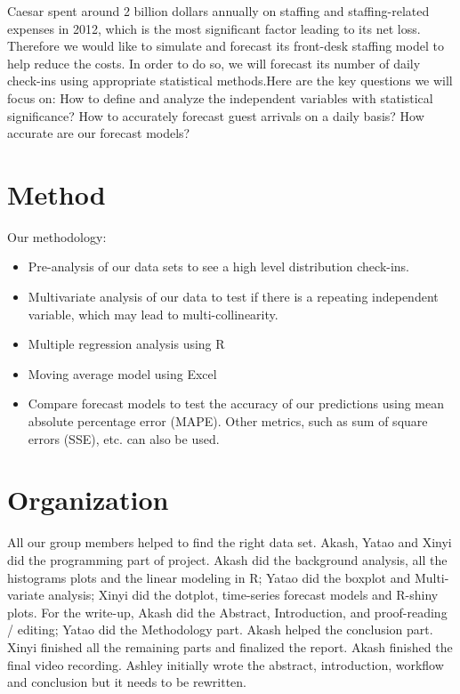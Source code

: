 \documentclass{article}
\begin{document}
Caesar spent around 2 billion dollars annually on staffing and staffing-related expenses in 2012, which is the most significant factor leading to its net loss. Therefore we would like to simulate and forecast its front-desk staffing model to help reduce the costs. In order to do so, we will forecast its number of daily check-ins using appropriate statistical methods.Here are the key questions we will focus on:
How to define and analyze the independent variables with statistical significance? 
How to accurately forecast guest arrivals on a daily basis?
How accurate are our forecast models?


\section{Method}
Our methodology: 
\begin{itemize}
  \item  Pre-analysis of our data sets to see a high level distribution check-ins.
  \item Multivariate analysis of our data to test if there is a repeating independent variable, which may lead to multi-collinearity. 
  \item Multiple regression analysis using R
  \item Moving average model using Excel
  \item Compare forecast models to test the accuracy of our predictions using mean absolute percentage error (MAPE). Other metrics, such as sum of square errors (SSE), etc. can also be used.
\end{itemize} 

\section{Organization}

All our group members helped to find the right data set. Akash, Yatao and Xinyi did the programming part of project. Akash did the background analysis, all the histograms plots and the linear modeling in R; Yatao did the boxplot and Multi-variate analysis; Xinyi did the dotplot, time-series forecast models and R-shiny plots. For the write-up, Akash did the Abstract, Introduction, and proof-reading / editing; Yatao did the Methodology part. Akash helped the conclusion part. Xinyi finished all the remaining parts and finalized the report. Akash finished the final video recording. 
Ashley initially wrote the abstract, introduction, workflow and conclusion but it needs to be rewritten. 
\end{document}

